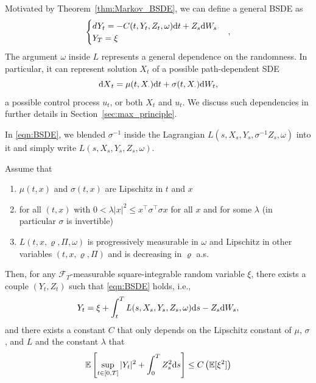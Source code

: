 \documentclass[11pt]{book}
\newcommand{\dt}{\text{\normalfont d}t}
\newcommand{\ds}{\text{\normalfont d}s}
\newcommand{\dX}{\text{\normalfont d}X}
\newcommand{\dW}{\text{\normalfont d}W}
\begin{document}
Motivated by Theorem~\ref{thm:Markov_BSDE}, we can define a general BSDE as 
\begin{equation}\label{eqn:BSDE}
	\begin{cases}
		dY_t=-C(t,Y_t,Z_t,\omega){{\dt}}+Z_s\dW_s\\
		Y_T=\xi
	\end{cases},
\end{equation}
The argument $\omega$ inside $L$ represents a general dependence on the randomness. In particular, it can represent solution $X_t$ of a possible path-dependent SDE
\begin{equation}
	{\dX}_t=\mu(t,X_\cdot){{\dt}}+\sigma(t,X_\cdot)\dW_t,
\end{equation}   
a possible control process $u_t$, or both $X_t$ and $u_t$. We discuss such dependencies in further details in Section~\ref{sec:max_principle}.
\begin{rem}
	In \eqref{eqn:BSDE}, we blended $\sigma^{-1}$ inside the Lagrangian $L(s,X_s,Y_s,\sigma^{-1}Z_s,\omega)$  into it and simply write $L(s,X_s,Y_s,Z_s,\omega)$.
\end{rem}
\begin{thm}
Assume that 
\begin{enumerate}[label=\bfseries \roman*)]
\item $\mu(t,x)$ and $\sigma(t,x)$ are Lipschitz in $t$ and $x$
\item for all $(t,x)$ with $0<\lambda|x|^2\le x^{\top}\sigma^{\top}\sigma x$ for all $x$ and  for some $\lambda$ (in particular $\sigma$ is invertible)
\item $L(t,x,\varrho,\Pi,\omega)$ is progressively measurable in $\omega$ and Lipschitz in  other variables $(t,x,\varrho,\Pi)$ and is decreasing in $\varrho$ a.s.
\end{enumerate} 
Then, for any $\mathcal{F}_T$-measurable square-integrable random variable $\xi$, there exists a couple $(Y_t,Z_t)$ such that \eqref{eqn:BSDE} holds, i.e.,
\begin{equation}
Y_t=\xi+\int_t^TL(s,X_s,Y_s,Z_s,\omega){{\ds}}-Z_s\dW_s,
\end{equation}
and there exists a constant $C$ that only depends on the Lipschitz constant of $\mu$, $\sigma$, and  $L$ and the constant $\lambda$ that
\begin{equation}
\mathbb{E}\left[\sup_{t\in[0,T]}|Y_t|^2+\int_0^TZ_s^2{{\ds}}\right]\le C\left(\mathbb{E}[\xi^2]\right)
\end{equation}
\end{thm}
\end{document}
